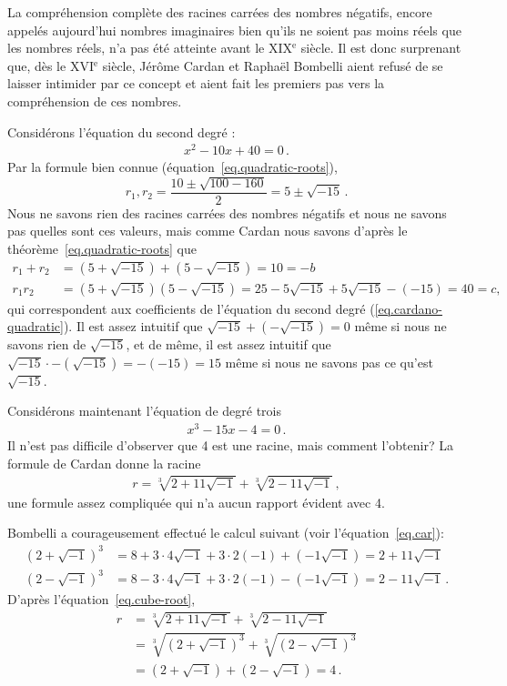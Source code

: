 La compréhension complète des racines carrées des nombres négatifs, encore appelés aujourd'hui nombres imaginaires  bien qu'ils ne soient pas moins réels que les nombres réels, n'a pas été atteinte avant le XIX$^\text{e}$ siècle. Il est donc surprenant que, dès le XVI$^\text{e}$ siècle, Jérôme Cardan et Raphaël Bombelli  aient refusé de se laisser intimider par ce concept et aient fait les premiers pas vers la compréhension de ces nombres.

Considérons l'équation du second degré :
\begin{align}
x^2-10x+40=0\,.\label{eq.cardano-quadratic}
\end{align}
Par la formule bien connue (équation~\ref{eq.quadratic-roots}),
\[
r_1, r_2=\displaystyle\frac{10\pm\sqrt{100-160}}{2}=5\pm\sqrt{-15}\,.
\]
Nous ne savons rien des racines carrées des nombres négatifs et nous ne savons pas quelles sont ces valeurs, mais comme Cardan nous savons d'après le théorème~\ref{eq.quadratic-roots} que 
\begin{align*}
r_1+r_2&=(5+\sqrt{-15})+(5-\sqrt{-15})=10=-b\\
r_1r_2&=(5+\sqrt{-15})(5-\sqrt{-15})=25-5\sqrt{-15}+5\sqrt{-15}-(-15)=40=c,
\end{align*}
qui correspondent aux coefficients de l'équation du second degré (\ref{eq.cardano-quadratic}). Il est assez intuitif que $\sqrt{-15}+(-\sqrt{-15})=0$ même si nous ne savons rien de $\sqrt{-15}$, et de même, il est assez intuitif que $\sqrt{-15}\cdot-(\sqrt{-15})=-(-15)=15$ même si nous ne savons pas ce qu'est $\sqrt{-15}$.

\enlargethispage{\baselineskip}

Considérons maintenant l'équation de degré trois
\begin{align}
x^3-15x-4=0\,.\label{eq.bombelli-cubic}
\end{align}
Il n'est pas difficile d'observer que 4 est une racine, mais comment l'obtenir? La formule de Cardan donne la racine 
\begin{align}
r=\sqrt[3]{2+11\sqrt{-1}}+\sqrt[3]{2-11\sqrt{-1}}\,,\label{eq.cube-root}
\end{align}
une formule assez compliquée qui n'a aucun rapport évident avec 4. 

Bombelli a courageusement effectué le calcul suivant (voir l'équation~\ref{eq.car}):
\begin{align*}
(2+\sqrt{-1})^3&=
8+3\cdot 4\sqrt{-1}+3\cdot 2(-1)+(-1\sqrt{-1})=
2+11\sqrt{-1}\\
(2-\sqrt{-1})^3&=
8-3\cdot 4\sqrt{-1}+3\cdot 2(-1)-(-1\sqrt{-1})=
2-11\sqrt{-1}\,.
\end{align*}
D'après l'équation~\ref{eq.cube-root},
\begin{align*}
r&=\sqrt[3]{2+11\sqrt{-1}} + \sqrt[3]{2-11\sqrt{-1}}\\
&=\sqrt[3]{(2+\sqrt{-1})^3} + \sqrt[3]{(2-\sqrt{-1})^3}\\
&=(2+\sqrt{-1}) + (2-\sqrt{-1})=4\,.
\end{align*}


